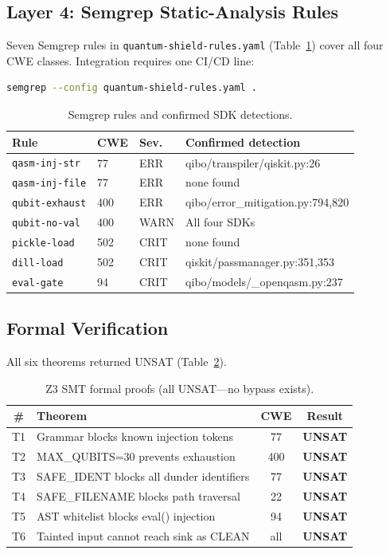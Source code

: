 \documentclass[conference,compsoc]{IEEEtran}
\begin{document}
\subsection{Layer 4: Semgrep Static-Analysis Rules}
\label{sec:semgrep}
\noindent Seven Semgrep rules in \texttt{quantum-shield-rules.yaml}
(Table~\ref{tab:semgrep}) cover all four CWE classes.
Integration requires one CI/CD line:

\begin{lstlisting}[language=bash, caption={One-line CI/CD integration.}]
semgrep --config quantum-shield-rules.yaml .
\end{lstlisting}

\begin{table}[!ht]
\centering
\small
\caption{Semgrep rules and confirmed SDK detections.}
\label{tab:semgrep}
\setlength{\tabcolsep}{3pt}
\begin{tabular}{llll}
\toprule
Rule & CWE & Sev. & Confirmed detection \\
\midrule
\texttt{qasm-inj-str}  & 77  & ERR  & qibo/transpiler/qiskit.py:26 \\
\texttt{qasm-inj-file} & 77  & ERR  & none found \\
\texttt{qubit-exhaust} & 400 & ERR  & qibo/error\_mitigation.py:794,820 \\
\texttt{qubit-no-val}  & 400 & WARN & All four SDKs \\
\texttt{pickle-load}   & 502 & CRIT & none found \\
\texttt{dill-load}     & 502 & CRIT & qiskit/passmanager.py:351,353 \\
\texttt{eval-gate}     & 94  & CRIT & qibo/models/\_openqasm.py:237 \\
\bottomrule
\end{tabular}
\end{table}

\subsection{Formal Verification}
\label{sec:formal}
\noindent All six theorems returned UNSAT (Table~\ref{tab:z3}).

\begin{table}[!ht]
\centering
\small
\caption{Z3 SMT formal proofs (all UNSAT---no bypass exists).}
\label{tab:z3}
\begin{tabular}{clcc}
\toprule
\# & Theorem & CWE & Result \\
\midrule
T1 & Grammar blocks known injection tokens     & 77  & \textbf{UNSAT} \\
T2 & MAX\_QUBITS=30 prevents exhaustion         & 400 & \textbf{UNSAT} \\
T3 & SAFE\_IDENT blocks all dunder identifiers  & 77  & \textbf{UNSAT} \\
T4 & SAFE\_FILENAME blocks path traversal       & 22  & \textbf{UNSAT} \\
T5 & AST whitelist blocks eval() injection      & 94  & \textbf{UNSAT} \\
T6 & Tainted input cannot reach sink as CLEAN   & all & \textbf{UNSAT} \\
\bottomrule
\end{tabular}
\end{table}
\end{document}
